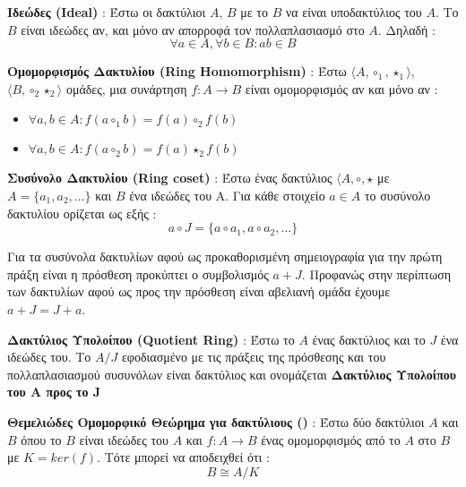 \begin{definition}
\textbf{Ιδεώδες (Ideal)} : Έστω οι δακτύλιοι $A$, $B$ με το $B$ να είναι υποδακτύλιος του $Α$. Το $B$ είναι ιδεώδες αν, και μόνο αν απορροφά τον πολλαπλασιασμό στο $A$. Δηλαδή :
$$
\forall a \in A, \forall b \in B : ab \in B
$$
\end{definition}

\begin{definition}
\textbf{Ομομορφισμός Δακτυλίου (Ring Homomorphism)} : Έστω $\langle A, \circ_1, \star_1 \rangle$, $\langle B, \circ_2 \star_2 \rangle$ ομάδες, μια συνάρτηση $f : A \rightarrow B$ είναι ομομορφισμός αν και μόνο αν :
\begin{itemize}
    \item $\forall a, b \in A : f(a \circ_1 b) = f(a) \circ_2 f(b)$
    \item $\forall a, b \in A : f(a \circ_2 b) = f(a) \star_2 f(b)$
\end{itemize}
\end{definition}

\begin{definition}
\textbf{Συσύνολο Δακτυλίου (Ring coset)} : Έστω ένας δακτύλιος $\langle A, \circ, \star$ με $Α = \{a_1, a_2, \ldots \}$ και $B$ ένα ιδεώδες του Α. Για κάθε στοιχείο $a \in A$ το συσύνολο δακτυλίου ορίζεται ως εξής :
$$
a \circ J = \{a \circ a_1, a \circ a_2, \ldots\}
$$
\end{definition}

Για τα συσύνολα δακτυλίων αφού ως προκαθορισμένη σημειογραφία για την πρώτη πράξη είναι η πρόσθεση προκύπτει ο συμβολισμός $a + J$. Προφανώς στην περίπτωση των δακτυλίων αφού ως προς την πρόσθεση είναι αβελιανή ομάδα έχουμε $a + J = J + a$.

\begin{definition}
\textbf{Δακτύλιος Υπολοίπου (Quotient Ring)} : Έστω το $Α$ ένας δακτύλιος και το $J$ ένα ιδεώδες του. Το $A / J$ εφοδιασμένο με τις πράξεις της πρόσθεσης και του πολλαπλασιασμού συσυνόλων είναι δακτύλιος και ονομάζεται \textbf{Δακτύλιος Υπολοίπου του A προς το J}
\end{definition}

\begin{definition}
\textbf{Θεμελιώδες Ομομορφικό Θεώρημα για δακτύλιους ()} : Έστω δύο δακτύλιοι $A$ και $B$ όπου το $B$ είναι ιδεώδες του $A$ και $f : A \rightarrow B$ ένας ομομορφισμός από το $A$ στο $B$ με $K = ker(f)$. Τότε μπορεί να αποδειχθεί ότι :
$$
Β \cong A / K
$$
\end{definition}

